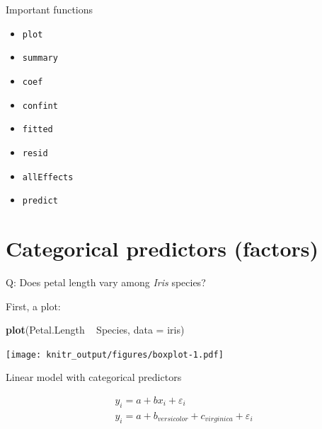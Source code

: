 \documentclass[10pt,ignorenonframetext,]{beamer}
\newenvironment{Shaded}{\begin{snugshade}}{\end{snugshade}}
\newcommand{\KeywordTok}[1]{\textcolor[rgb]{0.13,0.29,0.53}{\textbf{{#1}}}}
\newcommand{\DataTypeTok}[1]{\textcolor[rgb]{0.13,0.29,0.53}{{#1}}}
\newcommand{\StringTok}[1]{\textcolor[rgb]{0.31,0.60,0.02}{{#1}}}
\newcommand{\NormalTok}[1]{{#1}}
\begin{document}
\begin{frame}[fragile]{Important functions}

\begin{itemize}[<+->]
\item
  \texttt{plot}
\item
  \texttt{summary}
\item
  \texttt{coef}
\item
  \texttt{confint}
\item
  \texttt{fitted}
\item
  \texttt{resid}
\item
  \texttt{allEffects}
\item
  \texttt{predict}
\end{itemize}

\end{frame}

\section{Categorical predictors
(factors)}\label{categorical-predictors-factors}

\begin{frame}[fragile]{Q: Does petal length vary among \emph{Iris}
species?}

First, a plot:

\begin{Shaded}
\begin{Highlighting}[]
\KeywordTok{plot}\NormalTok{(Petal.Length ~}\StringTok{ }\NormalTok{Species, }\DataTypeTok{data =} \NormalTok{iris)}
\end{Highlighting}
\end{Shaded}

\texttt{[image: knitr\_output/figures/boxplot-1.pdf]}

\end{frame}

\begin{frame}{Linear model with categorical predictors}

\[
  \begin{aligned} 
  y_{i}=a+bx_{i}+\varepsilon _{i} \\  
  y_{i}=a+b_{versicolor}+c_{virginica}+\varepsilon _{i} \\     
  \end{aligned} 
\]

\end{frame}
\end{document}

